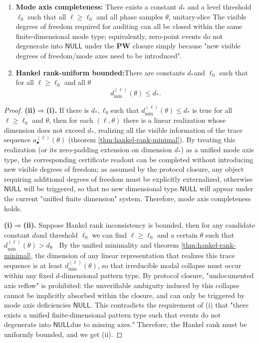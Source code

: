 \begin{theorem}
\begin{enumerate}
  \item[(i)] \textbf{Mode axis completeness:} There exists a constant \(d_\ast\) and a level threshold \(\ell_0\) such that all \(\ell\ge \ell_0\) and all phase samples \(\theta\), unitary-slice The visible degrees of freedom required for auditing can all be closed within the same finite-dimensional mode type; equivalently, zero-point events do not degenerate into \(\mathsf{NULL}\) under the \(\mathbf{PW}\) closure simply because "new visible degrees of freedom/mode axes need to be introduced".
  \item[(ii)] \textbf{Hankel rank-uniform bounded:}There are constants \(d_\ast\) ​​and \(\ell_0\) such that for all \(\ell\ge \ell_0\) and all \(\theta\)
  \[
  d^{(\ell)}_{\min}(\theta)\le d_\ast.
  \]
\end{enumerate}
\end{theorem}

\begin{proof}
\textbf{(ii)\(\Rightarrow\)(i).}
If there is \(d_\ast,\ell_0\) ​​such that \(d^{(\ell)}_{\min}(\theta)\le d_\ast\) is true for all \(\ell\ge\ell_0\) and \(\theta\), then for each \((\ell,\theta)\) there is a linear realization whose dimension does not exceed \(d_\ast\), realizing all the visible information of the trace sequence \(a^{(\ell)}_\bullet(\theta)\) (theorem \ref{thm:hankel-rank-minimal}).
By treating this realization (or its zero-padding extension on dimension \(d_\ast\)) as a unified mode axis type, the corresponding certificate readout can be completed without introducing new visible degrees of freedom; as assumed by the protocol closure, any object requiring additional degrees of freedom must be explicitly externalized, otherwise \(\mathsf{NULL}\) will be triggered, so that no new dimensional type \(\mathsf{NULL}\) will appear under the current "unified finite dimension" system.
Therefore, mode axis completeness holds.
\par
\textbf{(i)\(\Rightarrow\)(ii).}
Suppose Hankel rank inconsistency is bounded, then for any candidate constant \(d\) ​​and threshold \(\ell_0\) we can find \(\ell\ge\ell_0\) and a certain \(\theta\) such that
\(
d^{(\ell)}_{\min}(\theta)>\!d
\)。
By the unified minimality and theorem \ref{thm:hankel-rank-minimal}, the dimension of any linear representation that realizes this trace sequence is at least \(d^{(\ell)}_{\min}(\theta)\), so that irreducible modal collapse must occur within any fixed \(d\)-dimensional pattern type.
By protocol closure, "undocumented axis reflow" is prohibited: the unverifiable ambiguity induced by this collapse cannot be implicitly absorbed within the closure, and can only be triggered by mode axis deficiencies \(\mathsf{NULL}\).
This contradicts the requirement of (i) that "there exists a unified finite-dimensional pattern type such that events do not degenerate into \(\mathsf{NULL}\) ​​due to missing axes."
Therefore, the Hankel rank must be uniformly bounded, and we get (ii).
\end{proof}


